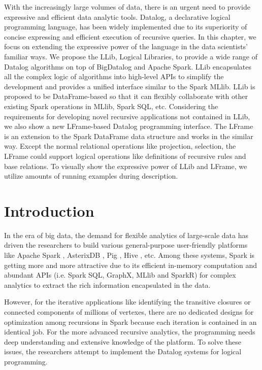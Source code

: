
With the increasingly large volumes of data, there is an urgent need to provide expressive and efficient data analytic tools. Datalog, a declarative logical programming language, has been widely implemented  due to its superiority of concise expressing and efficient execution of recursive queries. In this chapter, we focus on extending the expressive power of the language in the data scientists' familiar ways. We propose the LLib,  Logical Libraries, to provide a wide range of Datalog algorithms on top of BigDatalog and Apache Spark.  LLib encapsulates all the complex logic of algorithms into high-level APIs to simplify the development and   provides a unified interface similar to the Spark MLlib. LLib is proposed to be  DataFrame-based so that it can flexibly collaborate with other existing Spark operations in MLlib, Spark SQL, etc.
Considering the requirements for developing novel recursive applications not contained in LLib, we also show a new LFrame-based Datalog programming interface. The LFrame is an extension to the Spark DataFrame data structure and works in the similar way. Except the normal relational operations like projection, selection, the LFrame could support  logical operations like definitions of recursive rules and base relations. To visually show the expressive power of LLib and LFrame, we utilize amounts of running examples during description. 

\section{Introduction}
In the era of big data, the demand for flexible analytics of large-scale data has driven the researchers to build various general-purpose user-friendly platforms like Apache Spark   \citep{zaharia2012resilient}, AsterixDB \citep{alsubaiee2014asterixdb}, Pig \citep{olston2008pig}, Hive \citep{thusoo2009hive}, etc.  Among these systems, Spark is getting more and more attractive due to its efficient in-memory computation and abundant APIs (i.e. Spark SQL, GraphX, MLlib and SparkR) for complex analytics  to extract the rich information encapsulated in the data.

However, for the iterative applications like identifying the transitive closures or connected components of millions of vertexes, there are no dedicated designs for optimization among recursions in Spark because each iteration is contained in an identical job.  For the more advanced recursive analytics, the programming needs deep understanding and extensive knowledge of the platform.  To solve these issues, the researchers attempt to implement the Datalog  \citep{consens1990low} systems for logical programming. 

